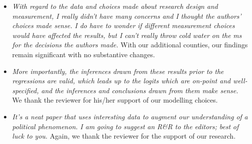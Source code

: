 \documentclass[12pt]{article}
\begin{document}
\begin{itemize}
\item \emph{With regard to the data and choices made about research
    design and measurement, I really didn't have many concerns and I
    thought the authors' choices made sense.  I do have to wonder if
    different measurement choices would have affected the results, but
    I can't really throw cold water on the ms for the decisions the
    authors made.} With our additional counties, our findings remain
  significant with no substantive changes.

\item \emph{More importantly, the inferences drawn from these results
    prior to the regressions are valid, which leads up to the logits
    which are on-point and well-specified, and the inferences and
    conclusions drawn from them make sense.} We thank the reviewer for
  his/her support of our modelling choices.


\item \emph{It's a neat paper that uses interesting data to augment
    our understanding of a political phenomenon. I am going to suggest
    an R\&R to the editors; best of luck to you.}  Again, we thank the
  reviewer for the support of our research.

\end{itemize}
\end{document}
